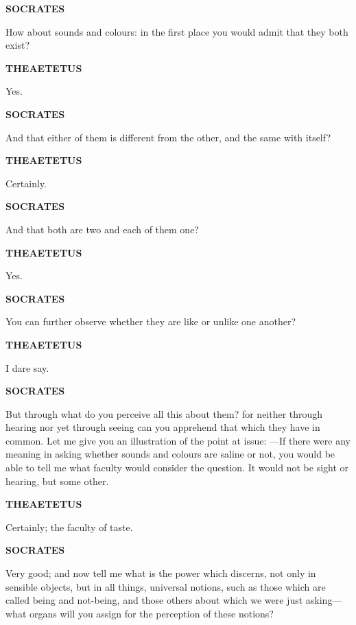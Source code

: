\documentclass[11pt,letter]{article}
\begin{document}
\par \textbf{SOCRATES}
\par   How about sounds and colours:  in the first place you would admit that they both exist?

\par \textbf{THEAETETUS}
\par   Yes.

\par \textbf{SOCRATES}
\par   And that either of them is different from the other, and the same with itself?

\par \textbf{THEAETETUS}
\par   Certainly.

\par \textbf{SOCRATES}
\par   And that both are two and each of them one?

\par \textbf{THEAETETUS}
\par   Yes.

\par \textbf{SOCRATES}
\par   You can further observe whether they are like or unlike one another?

\par \textbf{THEAETETUS}
\par   I dare say.

\par \textbf{SOCRATES}
\par   But through what do you perceive all this about them? for neither through hearing nor yet through seeing can you apprehend that which they have in common. Let me give you an illustration of the point at issue: —If there were any meaning in asking whether sounds and colours are saline or not, you would be able to tell me what faculty would consider the question. It would not be sight or hearing, but some other.

\par \textbf{THEAETETUS}
\par   Certainly; the faculty of taste.

\par \textbf{SOCRATES}
\par   Very good; and now tell me what is the power which discerns, not only in sensible objects, but in all things, universal notions, such as those which are called being and not-being, and those others about which we were just asking—what organs will you assign for the perception of these notions?
\end{document}
